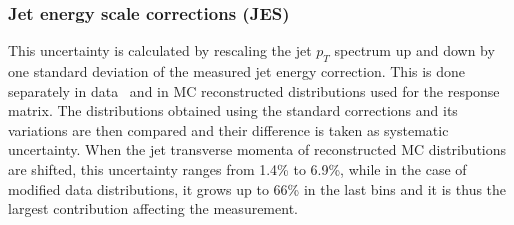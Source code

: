 \subsubsection{Jet energy scale corrections (JES)}
This uncertainty is calculated by rescaling the jet $p_T$ spectrum up and down by one standard deviation of the measured jet energy correction. This is done separately in data~\cite{CMS_PAS_13-007} and in MC reconstructed distributions used for the response matrix. The distributions obtained using the standard corrections and its variations are then compared and their difference is taken as systematic uncertainty. When the jet transverse momenta of reconstructed MC distributions are shifted, this uncertainty ranges from 1.4\% to 6.9\%, while in the case of modified data distributions, it grows up to 66\% in the last bins and it is thus the largest contribution affecting
the measurement.%



